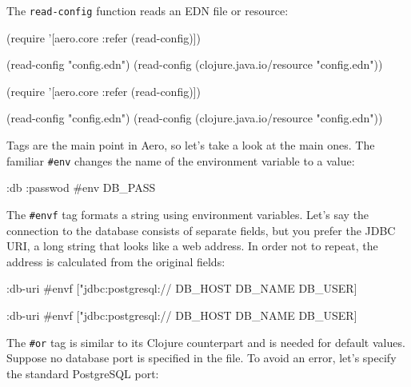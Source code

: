 
The \verb|read-config| function reads an EDN file or resource:

\ifx\DEVICETYPE\MOBILE

\begin{clojure}
(require
  '[aero.core :refer (read-config)])

(read-config "config.edn")
(read-config
  (clojure.java.io/resource
    "config.edn"))
\end{clojure}

\else

\begin{clojure}
(require '[aero.core :refer (read-config)])

(read-config "config.edn")
(read-config (clojure.java.io/resource "config.edn"))
\end{clojure}

\fi


Tags are the main point in Aero, so let's take a look at the main ones. The familiar \verb|#env| changes the name of the environment variable to a value:

\begin{clojure}
{:db {:passwod #env DB_PASS}}
\end{clojure}

The \verb|#envf| tag formats a string using environment variables. Let's say the connection to the database consists of separate fields, but you prefer the JDBC URI, a long string that looks like a web address. In order not to repeat, the address is calculated from the original fields:

\ifx\DEVICETYPE\MOBILE

\begin{clojure}
{:db-uri
 #envf ["jdbc:postgresql://%
        DB_HOST DB_NAME DB_USER]}
\end{clojure}

\else

\begin{clojure}
{:db-uri #envf ["jdbc:postgresql://%
                DB_HOST DB_NAME DB_USER]}
\end{clojure}

\fi

The \verb|#or| tag is similar to its Clojure counterpart and is needed for default values. Suppose no database port is specified in the file. To avoid an error, let's specify the standard PostgreSQL port:

